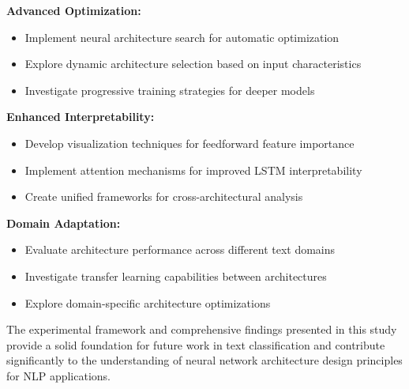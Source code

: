 \documentclass[a4paper, journal]{IEEEtran}
\begin{document}
\textbf{Advanced Optimization:}
\begin{itemize}
    \item Implement neural architecture search for automatic optimization
    \item Explore dynamic architecture selection based on input characteristics
    \item Investigate progressive training strategies for deeper models
\end{itemize}

\textbf{Enhanced Interpretability:}
\begin{itemize}
    \item Develop visualization techniques for feedforward feature importance
    \item Implement attention mechanisms for improved LSTM interpretability
    \item Create unified frameworks for cross-architectural analysis
\end{itemize}

\textbf{Domain Adaptation:}
\begin{itemize}
    \item Evaluate architecture performance across different text domains
    \item Investigate transfer learning capabilities between architectures
    \item Explore domain-specific architecture optimizations
\end{itemize}

The experimental framework and comprehensive findings presented in this study provide a solid foundation for future work in text classification and contribute significantly to the understanding of neural network architecture design principles for NLP applications. 




\end{document}
